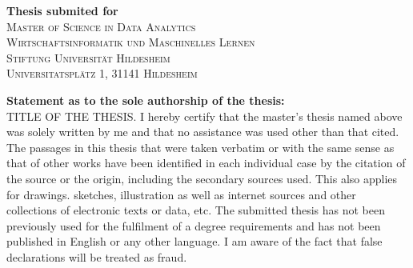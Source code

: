 \documentclass[a4paper,12pt]{report}
\begin{document}
\begin{titlepage}
{ \large \bfseries Thesis submited for}\\  %
\vspace{0.3cm}
\textsc{\Large Master of Science in Data Analytics}\\%
\vspace{1cm}
\textsc{\large Wirtschaftsinformatik und Maschinelles Lernen}\\ %
\vspace{0.3cm}
\textsc{\large Stiftung Universität Hildesheim}\\ %
\vspace{0.3cm}
\textsc{\large Universitatsplätz 1, 31141 Hildesheim}\\ %
\vspace{0.3cm}


\vfill %

\end{titlepage}


\setcounter{secnumdepth}{1}


\noindent \textbf{Statement as to the sole authorship of the thesis:}
\vspace{0.4cm}
\\TITLE OF THE THESIS.
I hereby certify that the master's thesis named above was solely written by me and that no assistance was used other than that cited. The passages in this thesis that were taken verbatim or with the same sense as that of other works have been identified in each individual case by the citation of the source or the origin, including the secondary sources used. This also applies for drawings. sketches, illustration as well as internet sources and other collections of electronic texts or data, etc. The submitted thesis has not been previously used for the fulfilment of a degree requirements and has not been published in English or any other language. I am aware of the fact that false declarations will be treated as fraud.
\vspace{7cm}
\end{document}
